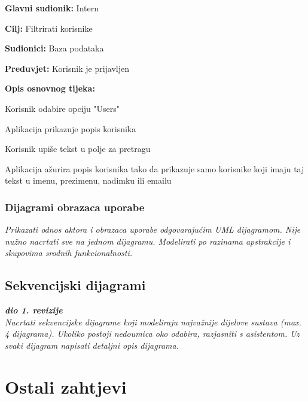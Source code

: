 					\noindent {}
					\begin{packed_item}

						\item \textbf{Glavni sudionik:} Intern
						\item \textbf{Cilj:} Filtrirati korisnike
						\item \textbf{Sudionici:} Baza podataka
						\item \textbf{Preduvjet:} Korisnik je prijavljen
						\item \textbf{Opis osnovnog tijeka:}

						\item[] \begin{packed_enum}

							\item Korisnik odabire opciju "Users"
							\item Aplikacija prikazuje popis korisnika
							\item Korisnik upiše tekst u polje za pretragu
							\item Aplikacija ažurira popis korisnika tako da prikazuje samo korisnike koji imaju taj tekst u imenu, prezimenu, nadimku ili emailu
						\end{packed_enum}
					\end{packed_item}
					
				\subsubsection{Dijagrami obrazaca uporabe}
					
					\textit{Prikazati odnos aktora i obrazaca uporabe odgovarajućim UML dijagramom. Nije nužno nacrtati sve na jednom dijagramu. Modelirati po razinama apstrakcije i skupovima srodnih funkcionalnosti.}
				\eject		
				
			\subsection{Sekvencijski dijagrami}
				
				\textbf{\textit{dio 1. revizije}}\\
				
				\textit{Nacrtati sekvencijske dijagrame koji modeliraju najvažnije dijelove sustava (max. 4 dijagrama). Ukoliko postoji nedoumica oko odabira, razjasniti s asistentom. Uz svaki dijagram napisati detaljni opis dijagrama.}
				\eject
	
		\section{Ostali zahtjevi}
		
